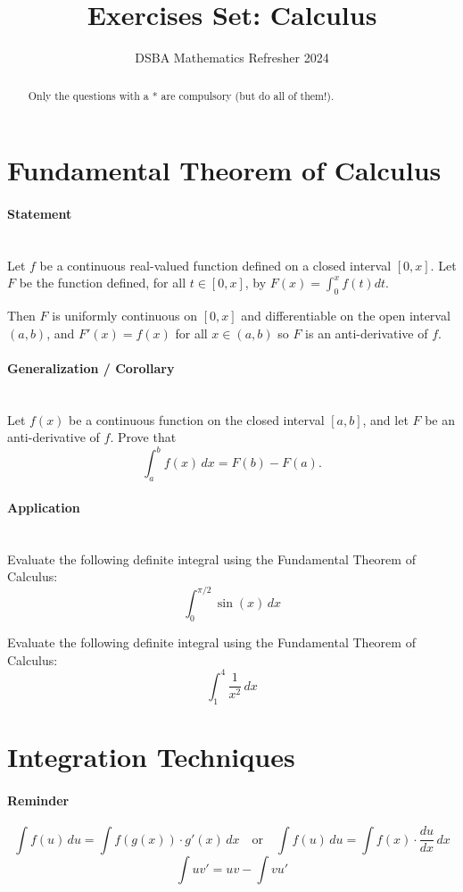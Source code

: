 \documentclass[]{article}
\title{Exercises Set: Calculus}
\author{DSBA Mathematics Refresher 2024}
\date{}
\begin{document}
	\maketitle
	
	\begin{abstract}
		Only the questions with a * are compulsory (but do all of them!).
	\end{abstract}
	
	\section{Fundamental Theorem of Calculus}
	\paragraph{Statement}\mbox{}\\
	Let $f$ be a continuous real-valued function defined on a closed interval $\left[ 0,x \right]$.
	Let $F$ be the function defined, for all $t \in \left[ 0,x \right]$, by $F(x) = \int_0^x f(t) dt$.
	
	Then $F$ is uniformly continuous on $\left[ 0,x \right]$ and differentiable on the open interval $\left( a,b \right)$, and $F'(x) = f(x)$ for all $x \in \left( a,b \right)$ so $F$ is an anti-derivative of $f$.
	
	\paragraph{Generalization / Corollary}\mbox{}\\
	Let \( f(x) \) be a continuous function on the closed interval \([a, b]\), and let \( F \) be an anti-derivative of \( f \).
	Prove that
	\[
	\int_a^b f(x) \, dx = F(b) - F(a).
	\]
	
	\paragraph{Application}\mbox{}\\
	Evaluate the following definite integral using the Fundamental Theorem of Calculus:
	\[
	\int_0^{\pi/2} \sin(x) \, dx
	\]
	
	Evaluate the following definite integral using the Fundamental Theorem of Calculus:
	\[
	\int_1^4 \frac{1}{x^2} \, dx
	\]
	
	
	\section{Integration Techniques}
	\paragraph{Reminder}
	$$\int f(u) \, du = \int f(g(x)) \cdot g'(x) \, dx \quad \text {or} \quad \int f(u) \, du = \int f(x) \cdot \frac{du}{dx} \, dx$$
	$$\int u v' = uv - \int v u'$$
	
\end{document}
